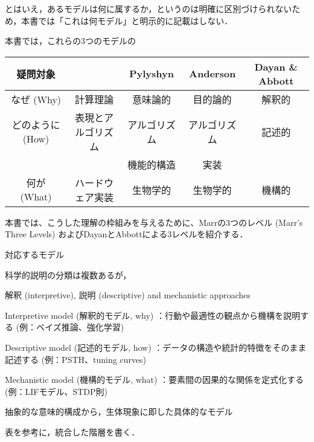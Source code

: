 \documentclass[titlepage]{ltjsbook}
\begin{document}
とはいえ，あるモデルは何に属するか，というのは明確に区別づけられないため，本書では「これは何モデル」と明示的に記載はしない．

本書では，これらの3つのモデルの

\begin{table}[]
\begin{tabular}{c|cccc}
\hline
疑問対象 &\citep{Marr1982-wk}  & Pylyshyn & Anderson & Dayan \& Abbott \\ \hline
なぜ (Why) & 計算理論 & 意味論的 & 目的論的  & 解釈的 \\ \hline
どのように (How) &  表現とアルゴリズム & アルゴリズム & アルゴリズム & 記述的 \\ \cline{3-4}
& & 機能的構造  & 実装 &\\ \hline
何が (What) & ハードウェア実装 & 生物学的 & 生物学的 & 機構的\\ \hline
\end{tabular}
\end{table}




本書では、こうした理解の枠組みを与えるために、Marrの3つのレベル (Marr's Three Levels)  \citep{Marr1982-wk} およびDayanとAbbottによる3レベルを紹介する．

対応するモデル

科学的説明の分類は複数あるが，

解釈 (interpretive), 説明 (descriptive)  and mechanistic approaches


Interpretive model (解釈的モデル, why) ：行動や最適性の観点から機構を説明する (例：ベイズ推論、強化学習) 

Descriptive model (記述的モデル, how) ：データの構造や統計的特徴をそのまま記述する (例：PSTH、tuning curves) 

Mechanistic model (機構的モデル, what) ：要素間の因果的な関係を定式化する (例：LIFモデル、STDP則) 

抽象的な意味的構成から，生体現象に即した具体的なモデル



表を参考に，統合した階層を書く．
\end{document}
